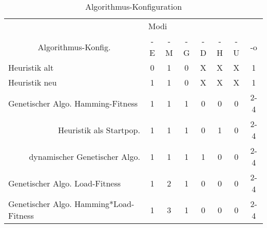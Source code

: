 	\begin{table}[htp]
		\centering
		\begin{tabular}{ccccccccc}
			\multicolumn{2}{l}{}                 & \multicolumn{7}{|l}{Modi}                                                               \\ 
			\multicolumn{2}{c}{Algorithmus-Konfig.}  & \multicolumn{1}{|c}{-E} & \multicolumn{1}{c}{-M} & \multicolumn{1}{c}{-G} & \multicolumn{1}{c}{-D} & \multicolumn{1}{c}{-H} & \multicolumn{1}{c}{-U} & \multicolumn{1}{c}{-o} \\ 
			\hline
		\multicolumn{2}{l}{Heuristik alt}  & \multicolumn{1}{|c}{0} & \multicolumn{1}{c}{1} & \multicolumn{1}{c}{0} & \multicolumn{1}{c}{X} & \multicolumn{1}{c}{X} & \multicolumn{1}{c}{X} & \multicolumn{1}{c}{1} \\
		\multicolumn{2}{l}{Heuristik neu}  & \multicolumn{1}{|c}{1} & \multicolumn{1}{c}{1} & \multicolumn{1}{c}{0} & \multicolumn{1}{c}{X} & \multicolumn{1}{c}{X} & \multicolumn{1}{c}{X} & \multicolumn{1}{c}{1} \\ 
		\multicolumn{2}{l}{Genetischer Algo. Hamming-Fitness}  & \multicolumn{1}{|c}{1} & \multicolumn{1}{c}{1} & \multicolumn{1}{c}{1} & \multicolumn{1}{c}{0} & \multicolumn{1}{c}{0} & \multicolumn{1}{c}{0} & \multicolumn{1}{c}{2-4} \\
			\multicolumn{2}{r}{Heuristik als Startpop.}  & \multicolumn{1}{|c}{1} & \multicolumn{1}{c}{1} & \multicolumn{1}{c}{1} & \multicolumn{1}{c}{0} & \multicolumn{1}{c}{1} & \multicolumn{1}{c}{0} & \multicolumn{1}{c}{2-4} \\
			\multicolumn{2}{r}{dynamischer Genetischer Algo.}  & \multicolumn{1}{|c}{1} & \multicolumn{1}{c}{1} & \multicolumn{1}{c}{1} & \multicolumn{1}{c}{1} & \multicolumn{1}{c}{0} & \multicolumn{1}{c}{0} & \multicolumn{1}{c}{2-4} \\
		\multicolumn{2}{l}{Genetischer Algo. Load-Fitness}  & \multicolumn{1}{|c}{1} & \multicolumn{1}{c}{2} & \multicolumn{1}{c}{1} & \multicolumn{1}{c}{0} & \multicolumn{1}{c}{0} & \multicolumn{1}{c}{0} & \multicolumn{1}{c}{2-4} \\ 
		\multicolumn{2}{l}{Genetischer Algo. Hamming*Load-Fitness}  & \multicolumn{1}{|c}{1} & \multicolumn{1}{c}{3} & \multicolumn{1}{c}{1} & \multicolumn{1}{c}{0} & \multicolumn{1}{c}{0} & \multicolumn{1}{c}{0} & \multicolumn{1}{c}{2-4}                     
		\end{tabular}
		\newline
		\caption{Algorithmus-Konfiguration}
	\end{table}

